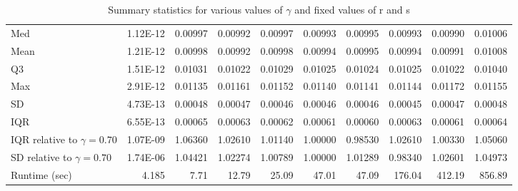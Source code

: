 \documentclass[a4paper, 11pt]{report}
\begin{document}
\begin{enumerate}
\begin{table}[H]
\begin{tabular}{lrrrrrrrrr}
				  Med & 1.12E-12 & 0.00997 & 0.00992 & 0.00997 & 0.00993 & 0.00995 & 0.00993 & 0.00990 & 0.01006 \\ 
				  Mean & 1.21E-12 & 0.00998 & 0.00992 & 0.00998 & 0.00994 & 0.00995 & 0.00994 & 0.00991 & 0.01008 \\ 
				  Q3 & 1.51E-12 & 0.01031 & 0.01022 & 0.01029 & 0.01025 & 0.01024 & 0.01025 & 0.01022 & 0.01040 \\ 
				  Max & 2.91E-12 & 0.01135 & 0.01161 & 0.01152 & 0.01140 & 0.01141 & 0.01144 & 0.01172 & 0.01155 \\ 
				  SD & 4.73E-13 & 0.00048 & 0.00047 & 0.00046 & 0.00046 & 0.00046 & 0.00045 & 0.00047 & 0.00048 \\ 
				  IQR & 6.55E-13 & 0.00065 & 0.00063 & 0.00062 & 0.00061 & 0.00060 & 0.00063 & 0.00061 & 0.00064 \\ 
				  IQR relative to $\gamma=0.70$ & 1.07E-09 & 1.06360 & 1.02610 & 1.01140 & 1.00000 & 0.98530 & 1.02610 &1.00330 & 1.05060 \\
				  SD relative to $\gamma=0.70$ & 1.74E-06 & 1.04421 & 1.02274 & 1.00789 & 1.00000 & 1.01289 & 0.98340 & 1.02601 & 1.04973 \\
				  Runtime (sec) & 4.185 & 7.71 & 12.79 & 25.09 & 47.01 & 47.09 & 176.04 & 412.19 & 856.89 \\
		   		\hline
				\end{tabular}
				\caption{Summary statistics for various values of $\gamma$ and fixed values of r and s}
				\label{gammatable}				
			\end{table} \normalsize		    
			

\end{enumerate}
\end{document}
